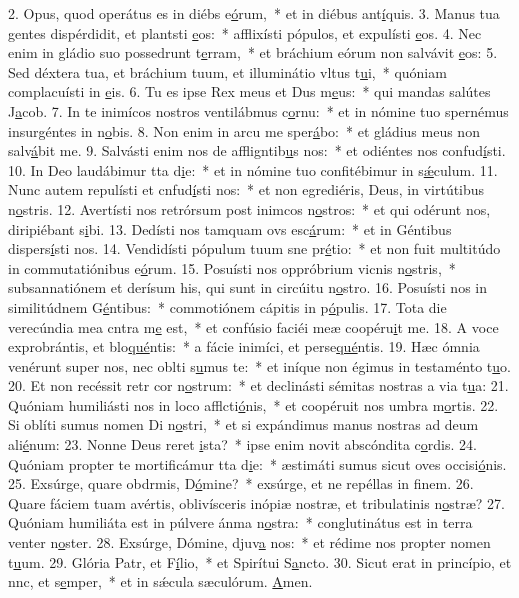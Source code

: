 2. Opus, quod operátus es in diébs e\uline{ó}rum,~* et in diébus ant\uline{í}quis.
3. Manus tua gentes dispérdidit, et plantsti \uline{e}os:~* afflixísti pópulos, et expulísti \uline{e}os.
4. Nec enim in gládio suo possedrunt t\uline{e}rram,~* et bráchium eórum non salvávit \uline{e}os:
5. Sed déxtera tua, et bráchium tuum, et illuminátio vltus t\uline{u}i,~* quóniam complacuísti in \uline{e}is.
6. Tu es ipse Rex meus et Dus m\uline{e}us:~* qui mandas salútes J\uline{a}cob.
7. In te inimícos nostros ventilábmus c\uline{o}rnu:~* et in nómine tuo spernémus insurgéntes in n\uline{o}bis.
8. Non enim in arcu me sper\uline{á}bo:~* et gládius meus non salv\uline{á}bit me.
9. Salvásti enim nos de affligntib\uline{u}s nos:~* et odiéntes nos confud\uline{í}sti.
10. In Deo laudábimur tta d\uline{i}e:~* et in nómine tuo confitébimur in s\uline{ǽ}culum.
11. Nunc autem repulísti et cnfud\uline{í}sti nos:~* et non egrediéris, Deus, in virtútibus n\uline{o}stris.
12. Avertísti nos retrórsum post inimcos n\uline{o}stros:~* et qui odérunt nos, diripiébant s\uline{i}bi.
13. Dedísti nos tamquam ovs esc\uline{á}rum:~* et in Géntibus dispers\uline{í}sti nos.
14. Vendidísti pópulum tuum sne pr\uline{é}tio:~* et non fuit multitúdo in commutatiónibus e\uline{ó}rum.
15. Posuísti nos oppróbrium vicnis n\uline{o}stris,~* subsannatiónem et derísum his, qui sunt in circúitu n\uline{o}stro.
16. Posuísti nos in similitúdnem G\uline{é}ntibus:~* commotiónem cápitis in p\uline{ó}pulis.
17. Tota die verecúndia mea cntra m\uline{e} est,~* et confúsio faciéi meæ coopéru\uline{i}t me.
18. A voce exprobrántis, et blo\uline{qué}ntis:~* a fácie inimíci, et perse\uline{qué}ntis.
19. Hæc ómnia venérunt super nos, nec oblti s\uline{u}mus te:~* et iníque non égimus in testaménto t\uline{u}o.
20. Et non recéssit retr cor n\uline{o}strum:~* et declinásti sémitas nostras a via t\uline{u}a:
21. Quóniam humiliásti nos in loco afflcti\uline{ó}nis,~* et coopéruit nos umbra m\uline{o}rtis.
22. Si oblíti sumus nomen Di n\uline{o}stri,~* et si expándimus manus nostras ad deum ali\uline{é}num:
23. Nonne Deus reret \uline{i}sta?~* ipse enim novit abscóndita c\uline{o}rdis.
24. Quóniam propter te mortificámur tta d\uline{i}e:~* æstimáti sumus sicut oves occisi\uline{ó}nis.
25. Exsúrge, quare obdrmis, D\uline{ó}mine?~* exsúrge, et ne repéllas in f\uline{i}nem.
26. Quare fáciem tuam avértis, oblivísceris inópiæ nostræ, et tribulatinis n\uline{o}stræ?
27. Quóniam humiliáta est in púlvere ánma n\uline{o}stra:~* conglutinátus est in terra venter n\uline{o}ster.
28. Exsúrge, Dómine, djuv\uline{a} nos:~* et rédime nos propter nomen t\uline{u}um.
29. Glória Patr, et F\uline{í}lio,~* et Spirítui S\uline{a}ncto.
30. Sicut erat in princípio, et nnc, et s\uline{e}mper,~* et in sǽcula sæculórum. \uline{A}men.
